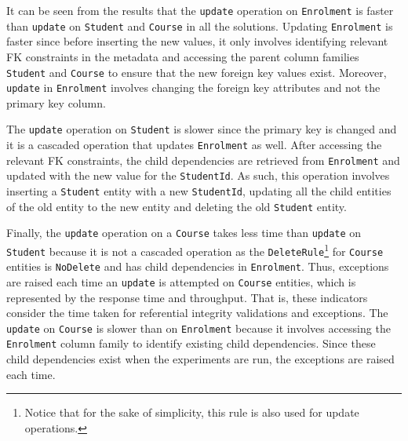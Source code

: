 It can be seen from the results that the \texttt{update} operation on
\texttt{Enrolment} is  faster than \texttt{update} on  \texttt{Student} and
\texttt{Course} in all the solutions. Updating \texttt{Enrolment} is faster
since before inserting the new values,  it only  involves  identifying relevant
\ac{FK} constraints in the metadata and accessing the parent column families
\texttt{Student} and \texttt{Course} to ensure that the new foreign key values
exist.  Moreover,  \texttt{update} in \texttt{Enrolment} involves changing the
foreign key attributes and not the primary key column.





The \texttt{update} operation  on  \texttt{Student} is slower since the primary
key is changed and it is a cascaded operation that updates \texttt{Enrolment} as
well. After accessing the relevant \ac{FK} constraints,  the child dependencies
are retrieved from \texttt{Enrolment} and updated with the new value for the
\texttt{StudentId}. As such, this operation involves inserting a
\texttt{Student} entity with a new \texttt{StudentId}, updating all the child
entities of the old entity to the new entity and deleting the old
\texttt{Student} entity.


% 


Finally, the \texttt{update} operation on a \texttt{Course} takes less time than
\texttt{update} on \texttt{Student} because it is not a cascaded operation as
the \texttt{DeleteRule}\footnote{Notice that for the sake of simplicity, this
rule is also used for update operations.} for \texttt{Course} entities is
\texttt{NoDelete} and has child dependencies in \texttt{Enrolment}.
Thus, exceptions are raised each time an \texttt{update} is attempted on
\texttt{Course} entities, which is represented by the response time and
throughput. That is, these indicators consider the time taken for referential
integrity validations and exceptions. The \texttt{update} on \texttt{Course} is
slower than on \texttt{Enrolment} because it involves accessing the
\texttt{Enrolment} column family to identify existing child dependencies.  Since
these child dependencies exist when the experiments are run,  the exceptions are
raised each time.

